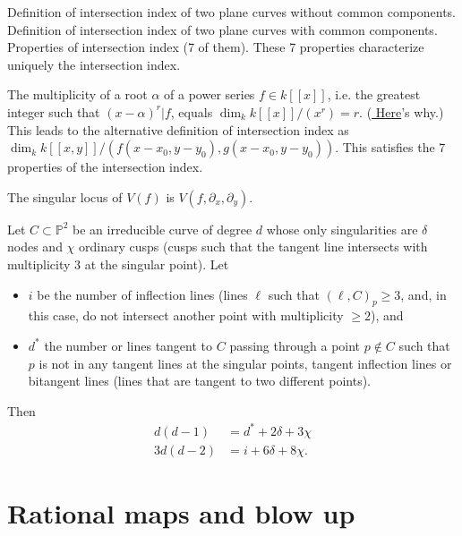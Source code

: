 Definition of intersection index of two plane curves
without common components.
Definition of intersection index of two plane curves
with common components.
Properties of intersection index (7 of them).
These 7 properties characterize uniquely the intersection index.

The multiplicity of a root $\alpha$ of a power series 
$f\in k[[x]]$,
i.e. the greatest integer such that $(x-\alpha)^r|f$,
equals $\dim_k k[[x]]/(x^r)=r$.
(\href{https://www.youtube.com/live/EspNBiSU8F4?si=UEcdxrysAS47ZA9H&t=5230}{
Here}'s why.)
This leads to the alternative definition
of intersection index as
$\dim_k k[[x,y]]/(f(x-x_0,y-y_0),g(x-x_0,y-y_0))$.
This satisfies the 7 properties of the intersection index.


\noindent
\begin{proposition}
\label{proposition-jacobian-criterion}
The singular locus of $V(f)$ is $V(f,\partial_x,\partial_y)$.
\end{proposition}



\begin{theorem}
\label{theorem-plucker-formulas}
Let $C \subset \mathbb{P}^2$ be an irreducible
curve of degree $d$ whose only singularities
are $\delta$ nodes and $\chi$ ordinary cusps
(cusps such that the tangent line intersects
with multiplicity 3 at the singular point).
Let 
\begin{itemize}
\item $i$ be the number of inflection lines
(lines $\ell$ such that $(\ell,C)_p \geq 3$,
and, in this case,
do not intersect another point with multiplicity $\geq 2$), and

\item $d^*$ the number or lines tangent to $C$
passing through a point $p \not\in C$ 
such that $p$ is not in any tangent lines at
the singular points, tangent inflection lines
or bitangent lines (lines that are tangent to two different points).
\end{itemize}

\noindent
Then
\begin{align*}
d(d-1)&=d^*+2\delta+3\chi\\
3d(d-2)&=i+6\delta+8\chi.
\end{align*}
\end{theorem}

\section{Rational maps and blow up}
\label{section-rational-maps-and-blow-up}

